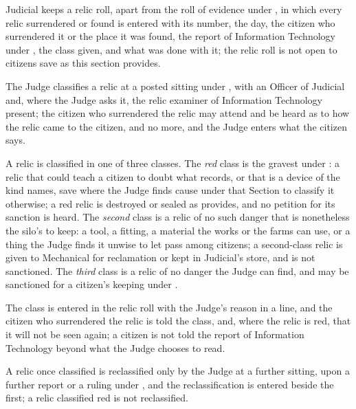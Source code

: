 \begin{clauses}
\item Judicial keeps a relic roll, apart from the roll of evidence under , in which every relic surrendered or found is entered with its number, the day, the citizen who surrendered it or the place it was found, the report of Information Technology under , the class given, and what was done with it; the relic roll is not open to citizens save as this section provides.
\item The Judge classifies a relic at a posted sitting under , with an Officer of Judicial and, where the Judge asks it, the relic examiner of Information Technology present; the citizen who surrendered the relic may attend and be heard as to how the relic came to the citizen, and no more, and the Judge enters what the citizen says.
\item A relic is classified in one of three classes. The \emph{red} class is the gravest under : a relic that could teach a citizen to doubt what  records, or that is a device of the kind  names, save where the Judge finds cause under that Section to classify it otherwise; a red relic is destroyed or sealed as  provides, and no petition for its sanction is heard. The \emph{second} class is a relic of no such danger that is nonetheless the silo's to keep: a tool, a fitting, a material the works or the farms can use, or a thing the Judge finds it unwise to let pass among citizens; a second-class relic is given to Mechanical for reclamation or kept in Judicial's store, and is not sanctioned. The \emph{third} class is a relic of no danger the Judge can find, and may be sanctioned for a citizen's keeping under .
\item The class is entered in the relic roll with the Judge's reason in a line, and the citizen who surrendered the relic is told the class, and, where the relic is red, that it will not be seen again; a citizen is not told the report of Information Technology beyond what the Judge chooses to read.
\item A relic once classified is reclassified only by the Judge at a further sitting, upon a further report or a ruling under , and the reclassification is entered beside the first; a relic classified red is not reclassified.
\end{clauses}

